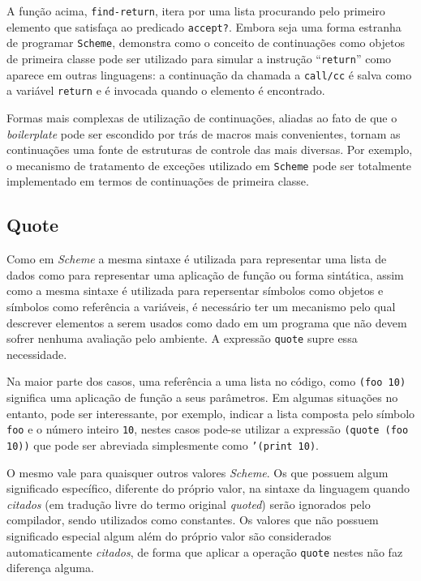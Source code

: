 A função acima, \texttt{find-return}, itera por uma lista procurando pelo 
primeiro elemento que satisfaça ao predicado \texttt{accept?}. Embora seja uma 
forma estranha de programar \texttt{Scheme}, demonstra como o conceito de 
continuações como objetos de primeira classe pode ser utilizado para simular
a instrução ``\texttt{return}'' como aparece em outras linguagens: a continuação
da chamada a \texttt{call/cc} é salva como a variável \texttt{return} e é 
invocada quando o elemento é encontrado. 

Formas mais complexas de utilização de continuações, aliadas ao fato de que o
\textit{boilerplate} pode ser escondido por trás de macros mais convenientes,
tornam as continuações uma fonte de estruturas de controle das mais diversas.
Por exemplo, o mecanismo de tratamento de exceções utilizado em \texttt{Scheme}
pode ser totalmente implementado em termos de continuações de primeira classe.

\subsection{Quote}
\label{ss:quote}

Como em \textit{Scheme} a mesma sintaxe é utilizada para representar uma lista
de dados como para representar uma aplicação de função ou forma sintática,
assim como a mesma sintaxe é utilizada para repersentar símbolos como objetos e
símbolos como referência a variáveis, é necessário ter um mecanismo pelo qual
descrever elementos a serem usados como dado em um programa que não devem
sofrer nenhuma avaliação pelo ambiente. A expressão \texttt{quote} supre essa
necessidade.

Na maior parte dos casos, uma referência a uma lista no código, como
\texttt{(foo 10)} significa uma aplicação de função a seus parâmetros. Em 
algumas situações no entanto, pode ser interessante, por exemplo, indicar a lista
composta pelo símbolo \texttt{foo} e o número inteiro \texttt{10}, nestes
casos pode-se utilizar a expressão \texttt{(quote (foo 10))} que pode ser 
abreviada simplesmente como \texttt{'(print 10)}. 

O mesmo vale para quaisquer outros valores \textit{Scheme}. Os que possuem
algum significado específico, diferente do próprio valor, na sintaxe da
linguagem quando \textit{citados} (em tradução livre do termo original
\textit{quoted}) serão ignorados pelo compilador, sendo utilizados como
constantes. Os valores que não possuem significado especial algum além do
próprio valor são considerados automaticamente \textit{citados}, de forma que
aplicar a operação \texttt{quote} nestes não faz diferença alguma.

